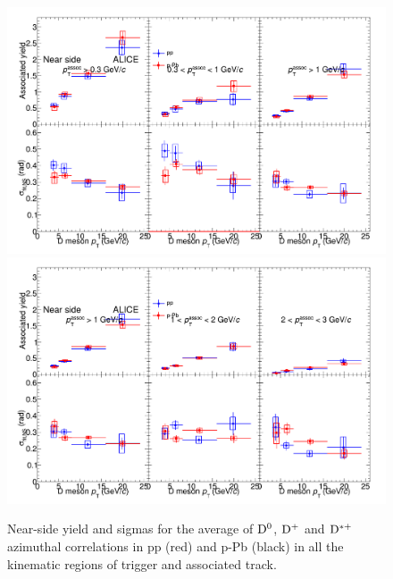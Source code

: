 \begin{figure}
\centering
\includegraphics[width=.95\linewidth]{figures/CfrPPandModels/CompareFitResults_ppVspPb_5TeV_1.png}
\includegraphics[width=.95\linewidth]{figures/CfrPPandModels/CompareFitResults_ppVspPb_5TeV_2.png}
\caption{Near-side yield and sigmas for the average of ${\rm D^0}$, ${\rm D^+}$ and ${\rm D^{*+}}$ azimuthal correlations in pp (red) and p-Pb (black) in all the kinematic regions of trigger and associated track.}
\label{fig:pp-pPb_FitNS}
\end{figure}

